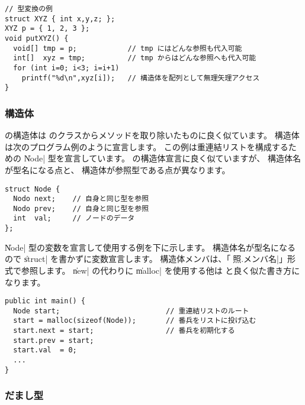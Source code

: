 \begin{mylist}
\begin{verbatim}
// 型変換の例
struct XYZ { int x,y,z; };
XYZ p = { 1, 2, 3 };
void putXYZ() {
  void[] tmp = p;            // tmp にはどんな参照も代入可能
  int[]  xyz = tmp;          // tmp からはどんな参照へも代入可能
  for (int i=0; i<3; i=i+1)
    printf("%d\n",xyz[i]);   // 構造体を配列として無理矢理アクセス
}
\end{verbatim}
\end{mylist}

\subsubsection{構造体}

\label{chap3:struct}
\cmml の構造体は \javal のクラスからメソッドを取り除いたものに良く似ています。
構造体は次のプログラム例のように宣言します。
この例は重連結リストを構成するための \|Node| 型を宣言しています。
\cl の構造体宣言に良く似ていますが、
構造体名が型名になる点と、
構造体が参照型である点が異なります。

\begin{mylist}
\begin{verbatim}
struct Node {
  Nodo next;    // 自身と同じ型を参照
  Nodo prev;    // 自身と同じ型を参照
  int  val;     // ノードのデータ
};
\end{verbatim}
\end{mylist}

\|Node| 型の変数を宣言して使用する例を下に示します。
構造体名が型名になるので \|struct| を書かずに変数宣言します。
構造体メンバは、「\|参照.メンバ名|」形式で参照します。
\|new| の代わりに \|malloc| を使用する他は
\javal と良く似た書き方になります。

\begin{mylist}
\begin{verbatim}
public int main() {
  Node start;                         // 重連結リストのルート
  start = malloc(sizeof(Node));       // 番兵をリストに投げ込む
  start.next = start;                 // 番兵を初期化する
  start.prev = start;
  start.val  = 0;
  ...
}
\end{verbatim}
\end{mylist}

\subsubsection{だまし型}

